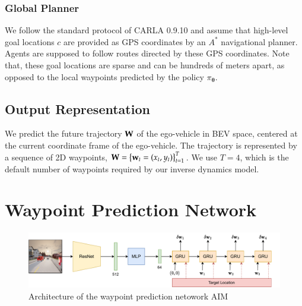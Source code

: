 \documentclass[12pt, letterpaper,cleardoubleempty,BCOR1cm]{scrbook}
\begin{document}
\subsubsection{Global Planner}
\label{sec:org0cfebb7}
We follow the standard protocol of CARLA 0.9.10 and assume that high-level goal
locations \(c\) are provided as GPS coordinates by an \(A^{*}\) navigational
planner. Agents are supposed to follow routes directed by these GPS
coordinates. Note that, these goal locations are sparse and can be hundreds of
meters apart, as opposed to the local waypoints predicted by the policy
\(\pi_{\boldsymbol{\theta}}\).

\subsection{Output Representation}
\label{sec:orgdd01dae}
We predict the future trajectory \(\textbf W\) of the ego-vehicle in BEV space,
centered at the current coordinate frame of the ego-vehicle. The trajectory is
represented by a sequence of 2D waypoints, \(\textbf W = \left\lbrace \textbf w_t = (x_t ,
y_t) \right\rbrace_{t=1}^{T}\).  We use \(T=4\), which is the default number of waypoints
required by our inverse dynamics model.

\section{Waypoint Prediction Network \label{org6328e99}}
\label{sec:orgbc2bf88}
\begin{figure}[H]
\centering
\includegraphics[keepaspectratio,width=\textwidth,height=\textheight]{./img/aim.pdf}
\caption{\label{fig:orgabe7682}Architecture of the waypoint prediction netowork AIM \cite{Prakash2021}}
\end{figure}
\end{document}
